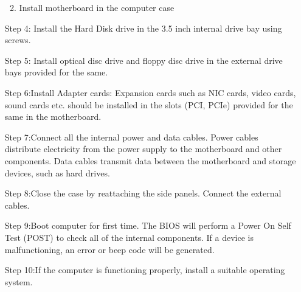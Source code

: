 \begin{enumerate}
\begin{enumerate}
\begin{itemize}
			\end{itemize}
		\item Install motherboard in the computer case
	\end{enumerate}
	\item [Step]4: Install the Hard Disk drive in the 3.5 inch internal drive bay using screws.
	\item [Step]5: Install optical disc drive and floppy disc drive in the external drive bays provided for the same.
	\item [Step]  6:Install Adapter cards: Expansion cards such as NIC cards, video cards, sound cards etc. should be installed in the slots (PCI, PCIe) provided for the same in the motherboard.

	\item [Step]7:Connect all the internal power and data cables. Power cables distribute electricity from the power supply to the motherboard and other components. Data cables transmit data between the motherboard and storage devices, such as hard drives.
	\item [Step]8:Close the case by reattaching the side panels. Connect the external cables.
	\item [Step]9:Boot computer for first time. The BIOS will perform a Power On Self Test (POST) to check all of the internal components. If a device is malfunctioning, an error or beep code will be generated.
	\item [Step]10:If the computer is functioning properly, install a suitable operating system.


\end{enumerate}